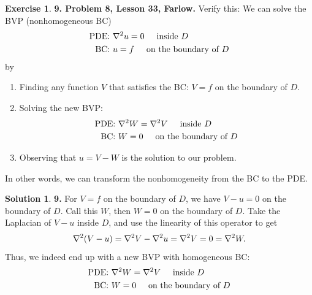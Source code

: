 \documentclass{book}
\theoremstyle{definition}
\newtheorem*{exer*}{Exercise}
\newtheorem*{sln*}{Solution}
\begin{document}
\begin{exer*}\textbf{9. Problem 8, Lesson 33, Farlow.} Verify this: We can solve the BVP (nonhomogeneous BC)
	\begin{align*}
	\text{PDE: }& \laplacian u  = 0 \hspace{0.5cm} \text{inside }D\\
	\text{BC: } & u =f \hspace{0.5cm} \text{on the boundary of }D
	\end{align*}
	by 
	\begin{enumerate}
		\item Finding any function $V$ that satisfies the BC: $V = f$ on the boundary of $D$. 
		\item Solving the new BVP:
		\begin{align*}
		\text{PDE: }& \laplacian W  = \laplacian V \hspace{0.5cm} \text{inside }D\\
		\text{BC: } & W = 0 \hspace{0.5cm} \text{on the boundary of }D
		\end{align*}
		\item Observing that $u = V - W$ is the solution to our problem. 
	\end{enumerate}
	In other words, we can transform the nonhomogeneity from the BC to the PDE.
	
	\begin{sln*}\textbf{9.} 
		For $V = f$ on the boundary of $D$, we have $V - u = 0$ on the boundary of $D$. Call this $W$, then $W = 0$ on the boundary of $D$. Take the Laplacian of $V-u$ inside $D$, and use the linearity of this operator to get
		\begin{align*}
		\laplacian (V-u) = \laplacian V - \laplacian u = \laplacian V =  0 = \laplacian W.
		\end{align*}
		Thus, we indeed end up with a new BVP with homogeneous BC:
		\begin{align*}
		\text{PDE: }& \laplacian W  = \laplacian V \hspace{0.5cm} \text{inside }D\\
		\text{BC: } & W = 0 \hspace{0.5cm} \text{on the boundary of }D
		\end{align*}
	\end{sln*}
\end{exer*}




\newpage
\end{document}

